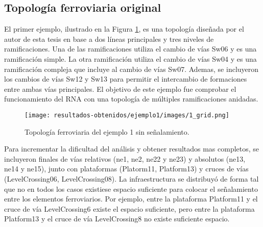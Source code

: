 \subsection{Topología ferroviaria original}

	El primer ejemplo, ilustrado en la Figura \ref{fig:EJ1_1}, es una topología diseñada por el autor de esta tesis en base a dos líneas principales y tres niveles de ramificaciones. Una de las ramificaciones utiliza el cambio de vías Sw06 y es una ramificación simple. La otra ramificación utiliza el cambio de vías Sw04 y es una ramificación compleja que incluye al cambio de vías Sw07. Ademas, se incluyeron los cambios de vías Sw12 y Sw13 para permitir el intercambio de formaciones entre ambas vías principales. El objetivo de este ejemplo fue comprobar el funcionamiento del RNA con una topología de múltiples ramificaciones anidadas.
	
	\begin{figure}[h]
		\centering
		\texttt{[image: resultados-obtenidos/ejemplo1/images/1\_grid.png]}
		\centering\caption{Topología ferroviaria del ejemplo 1 sin señalamiento.}
		\label{fig:EJ1_1}
	\end{figure}
	
	Para incrementar la dificultad del análisis y obtener resultados mas completos, se incluyeron finales de vías relativos (ne1, ne2, ne22 y ne23) y absolutos (ne13, ne14 y ne15), junto con plataformas (Platorm11, Platform13) y cruces de vías (LevelCrossing06, LevelCrossing08). La infraestructura se distribuyó de forma tal que no en todos los casos existiese espacio suficiente para colocar el señalamiento entre los elementos ferroviarios. Por ejemplo, entre la plataforma Platform11 y el cruce de vía LevelCrossing6 existe el espacio suficiente, pero entre la plataforma Platform13 y el cruce de vía LevelCrossing8 no existe suficiente espacio.